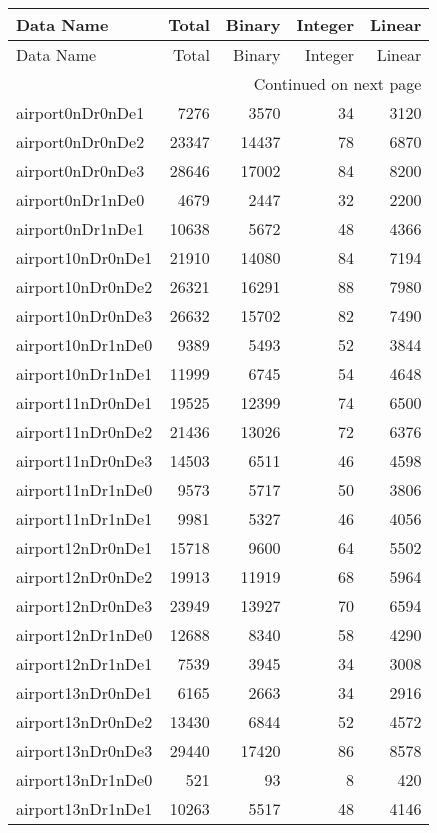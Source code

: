 \begin{longtable}{lrrrr}
\toprule
Data Name & Total & Binary & Integer & Linear \\
\midrule
\endfirsthead
\toprule
Data Name & Total & Binary & Integer & Linear \\
\midrule
\endhead
\midrule
\multicolumn{5}{r}{Continued on next page} \\
\midrule
\endfoot
\bottomrule
\endlastfoot
airport0nDr0nDe1 & 7276 & 3570 & 34 & 3120 \\
airport0nDr0nDe2 & 23347 & 14437 & 78 & 6870 \\
airport0nDr0nDe3 & 28646 & 17002 & 84 & 8200 \\
airport0nDr1nDe0 & 4679 & 2447 & 32 & 2200 \\
airport0nDr1nDe1 & 10638 & 5672 & 48 & 4366 \\
airport10nDr0nDe1 & 21910 & 14080 & 84 & 7194 \\
airport10nDr0nDe2 & 26321 & 16291 & 88 & 7980 \\
airport10nDr0nDe3 & 26632 & 15702 & 82 & 7490 \\
airport10nDr1nDe0 & 9389 & 5493 & 52 & 3844 \\
airport10nDr1nDe1 & 11999 & 6745 & 54 & 4648 \\
airport11nDr0nDe1 & 19525 & 12399 & 74 & 6500 \\
airport11nDr0nDe2 & 21436 & 13026 & 72 & 6376 \\
airport11nDr0nDe3 & 14503 & 6511 & 46 & 4598 \\
airport11nDr1nDe0 & 9573 & 5717 & 50 & 3806 \\
airport11nDr1nDe1 & 9981 & 5327 & 46 & 4056 \\
airport12nDr0nDe1 & 15718 & 9600 & 64 & 5502 \\
airport12nDr0nDe2 & 19913 & 11919 & 68 & 5964 \\
airport12nDr0nDe3 & 23949 & 13927 & 70 & 6594 \\
airport12nDr1nDe0 & 12688 & 8340 & 58 & 4290 \\
airport12nDr1nDe1 & 7539 & 3945 & 34 & 3008 \\
airport13nDr0nDe1 & 6165 & 2663 & 34 & 2916 \\
airport13nDr0nDe2 & 13430 & 6844 & 52 & 4572 \\
airport13nDr0nDe3 & 29440 & 17420 & 86 & 8578 \\
airport13nDr1nDe0 & 521 & 93 & 8 & 420 \\
airport13nDr1nDe1 & 10263 & 5517 & 48 & 4146 \\

\end{longtable}

